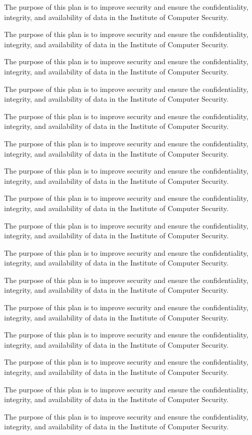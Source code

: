 The purpose of this plan is to improve security and ensure the confidentiality, integrity, and availability of data in the Institute of Computer Security.

The purpose of this plan is to improve security and ensure the confidentiality, integrity, and availability of data in the Institute of Computer Security.

The purpose of this plan is to improve security and ensure the confidentiality, integrity, and availability of data in the Institute of Computer Security.

The purpose of this plan is to improve security and ensure the confidentiality, integrity, and availability of data in the Institute of Computer Security.

The purpose of this plan is to improve security and ensure the confidentiality, integrity, and availability of data in the Institute of Computer Security.

The purpose of this plan is to improve security and ensure the confidentiality, integrity, and availability of data in the Institute of Computer Security.

The purpose of this plan is to improve security and ensure the confidentiality, integrity, and availability of data in the Institute of Computer Security.

The purpose of this plan is to improve security and ensure the confidentiality, integrity, and availability of data in the Institute of Computer Security.

The purpose of this plan is to improve security and ensure the confidentiality, integrity, and availability of data in the Institute of Computer Security.

The purpose of this plan is to improve security and ensure the confidentiality, integrity, and availability of data in the Institute of Computer Security.

The purpose of this plan is to improve security and ensure the confidentiality, integrity, and availability of data in the Institute of Computer Security.

The purpose of this plan is to improve security and ensure the confidentiality, integrity, and availability of data in the Institute of Computer Security.

The purpose of this plan is to improve security and ensure the confidentiality, integrity, and availability of data in the Institute of Computer Security.

The purpose of this plan is to improve security and ensure the confidentiality, integrity, and availability of data in the Institute of Computer Security.

The purpose of this plan is to improve security and ensure the confidentiality, integrity, and availability of data in the Institute of Computer Security.

The purpose of this plan is to improve security and ensure the confidentiality, integrity, and availability of data in the Institute of Computer Security.

